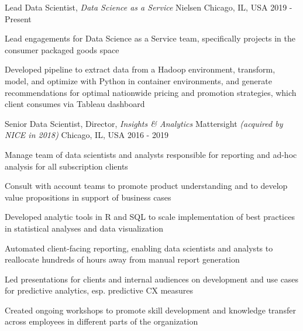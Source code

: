 
\begin{cventries}

 \cventry
    {Lead Data Scientist, \textit{Data Science as a Service}} %
    {Nielsen} %
    {Chicago, IL, USA} %
    {2019 - Present} %
    {
      \begin{cvitems}
        \item {Lead engagements for Data Science as a Service team, specifically projects in the consumer packaged goods space}
        \item {Developed pipeline to extract data from a Hadoop environment, transform, model, and optimize with Python in container environments, and generate recommendations for optimal nationwide pricing and promotion strategies, which client consumes via Tableau dashboard}
      \end{cvitems}
    }

 \cventry
    {Senior Data Scientist, Director, \textit{Insights \& Analytics}} %
    {Mattersight \textit{\textmd{(acquired by NICE in 2018)}}} %
    {Chicago, IL, USA} %
    {2016 - 2019} %
    {
      \begin{cvitems}
        \item {Manage team of data scientists and analysts responsible for reporting and ad-hoc analysis for all subscription clients}
        \item {Consult with account teams to promote product understanding and to develop value propositions in support of business cases}
        \item {Developed analytic tools in R and SQL to scale implementation of best practices in statistical analyses and data visualization}
        \item {Automated client-facing reporting, enabling data scientists and analysts to reallocate hundreds of hours away from manual report generation}
        \item {Led presentations for clients and internal audiences on development and use cases for predictive analytics, esp. predictive CX measures}
        \item {Created ongoing workshops to promote skill development and knowledge transfer across employees in different parts of the organization}
      \end{cvitems}
    }


\end{cventries}
